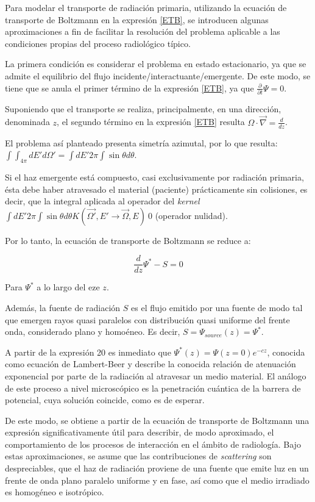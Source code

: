 Para modelar el transporte de radiación primaria, utilizando la ecuación de transporte de Boltzmann en la expresión \ref{ETB}, se introducen algunas aproximaciones a fin de facilitar la resolución del problema aplicable a las condiciones propias del proceso radiológico típico.

La primera condición es considerar el problema en estado estacionario, ya que se admite el equilibrio del flujo incidente/interactuante/emergente. De este modo, se tiene que se anula el primer término de la expresión \ref{ETB}, ya que $\frac{\partial}{\partial t} \Psi = 0$.

Suponiendo que el transporte se realiza, principalmente, en una dirección, denominada $z$, el segundo término en la expresión \ref{ETB} resulta $\Omega\cdot\vec{\nabla} = \frac{d}{dz}$.

El problema así planteado presenta simetría azimutal, por lo que resulta: $\int \int_{4\pi} dE' d\Omega' = \int dE' 2\pi \int \sin \theta d\theta$.

Si el haz emergente está compuesto, casi exclusivamente por radiación primaria, ésta debe haber atravesado el material (paciente) prácticamente sin colisiones, es decir, que la integral aplicada al operador del \emph{kernel} $\int dE' 2\pi \int \sin \theta d\theta K(\vec{\Omega'}, E' \rightarrow \vec{\Omega}, E) ~ 0$ (operador nulidad).

Por lo tanto, la ecuación de transporte de Boltzmann se reduce a:

\begin{equation}
 \frac{d}{dz} \Psi^{*} - S = 0
\end{equation}

Para $\Psi^{*}$ a lo largo del eze $z$.

Además, la fuente de radiación $S$ es el flujo emitido por una fuente de modo tal que emergen rayos quasi paralelos con distribución quasi uniforme del frente onda, considerado plano y homoéneo. Es decir, $S = \Psi_{source} (z) = \Psi^{*}$.

A partir de la expresión 20 es inmediato que $\Psi^{*}(z) = \Psi(z = 0) e^{-cz}$, conocida como ecuación de Lambert-Beer y describe la conocida relación de atenuación exponencial por parte de la radiación al atravesar un medio material. El análogo de este proceso a nivel microscópico es la penetración cuántica de la barrera de potencial, cuya solución coincide, como es de esperar.

De este modo, se obtiene a partir de la ecuación de transporte de Boltzmann una expresión significativamente útil para describir, de modo aproximado, el comportamiento de los procesos de interacción en el ámbito de radiología. Bajo estas aproximaciones, se asume que las contribuciones de \emph{scattering} son despreciables, que el haz de radiación proviene de una fuente que emite luz en un frente de onda plano paralelo uniforme y en fase, así como que el medio irradiado es homogéneo e isotrópico.

